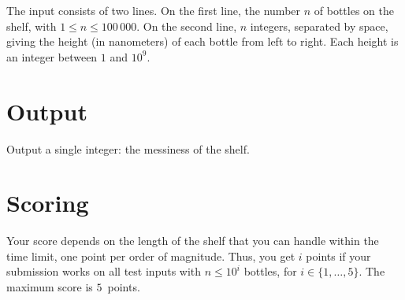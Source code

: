 The input consists of two lines.
On the first line, the number $n$ of bottles on the shelf, with $1\leq n\leq 100\,000$.
On the second line, $n$ integers, separated by space, giving the height (in nanometers) of each bottle from left to right.
Each height is an integer between $1$ and $10^9$.

\section*{Output}

Output a single integer: the messiness of the shelf.

\section*{Scoring}

Your score depends on the length of the shelf that you can handle within the time limit, one point per order of magnitude.
Thus, you get $i$ points if your submission works on all test inputs with $n\leq 10^i$ bottles, for $i\in\{1,\ldots, 5\}$.
The maximum score is $5$~points.

